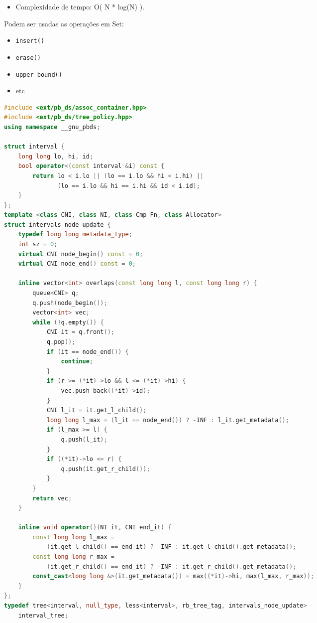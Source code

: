 \documentclass[11pt, a4paper, oneside]{book}
\begin{document}
\begin{itemize}
\item Complexidade de tempo: O( N * log(N) ).
\end{itemize}



Podem ser usadas as operações em Set: 



\begin{itemize}
\item \lstinline{insert()}
\item \lstinline{erase()}
\item \lstinline{upper_bound()}
\item etc
\end{itemize}

\hfill

\begin{multicols}{2}
\begin{lstlisting}[language=C++]
#include <ext/pb_ds/assoc_container.hpp>
#include <ext/pb_ds/tree_policy.hpp>
using namespace __gnu_pbds;

struct interval {
    long long lo, hi, id;
    bool operator<(const interval &i) const {
        return lo < i.lo || (lo == i.lo && hi < i.hi) ||
               (lo == i.lo && hi == i.hi && id < i.id);
    }
};
template <class CNI, class NI, class Cmp_Fn, class Allocator>
struct intervals_node_update {
    typedef long long metadata_type;
    int sz = 0;
    virtual CNI node_begin() const = 0;
    virtual CNI node_end() const = 0;

    inline vector<int> overlaps(const long long l, const long long r) {
        queue<CNI> q;
        q.push(node_begin());
        vector<int> vec;
        while (!q.empty()) {
            CNI it = q.front();
            q.pop();
            if (it == node_end()) {
                continue;
            }
            if (r >= (*it)->lo && l <= (*it)->hi) {
                vec.push_back((*it)->id);
            }
            CNI l_it = it.get_l_child();
            long long l_max = (l_it == node_end()) ? -INF : l_it.get_metadata();
            if (l_max >= l) {
                q.push(l_it);
            }
            if ((*it)->lo <= r) {
                q.push(it.get_r_child());
            }
        }
        return vec;
    }

    inline void operator()(NI it, CNI end_it) {
        const long long l_max =
            (it.get_l_child() == end_it) ? -INF : it.get_l_child().get_metadata();
        const long long r_max =
            (it.get_r_child() == end_it) ? -INF : it.get_r_child().get_metadata();
        const_cast<long long &>(it.get_metadata()) = max((*it)->hi, max(l_max, r_max));
    }
};
typedef tree<interval, null_type, less<interval>, rb_tree_tag, intervals_node_update>
    interval_tree;
\end{lstlisting}
\end{multicols}
\end{document}
